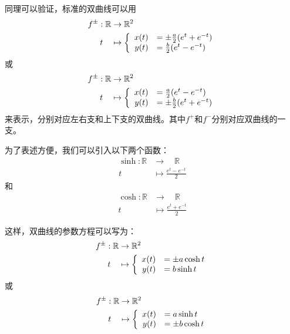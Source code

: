 \documentclass[12pt,UTF8]{ctexbook}
\theoremstyle{definition}
\theoremstyle{plain}
\begin{document}
同理可以验证，标准的双曲线可以用
\begin{align*}
    f^{\pm}: \mathbb{R} &\rightarrow \mathbb{R}^2 \\
    t\quad &\mapsto\left\{
        \begin{array}[]{rl}
            x(t) &= \pm\frac{a}{2}(e^t + e^{-t}) \\
            y(t) &= \frac{b}{2}(e^t - e^{-t}) \\
        \end{array}
    \right.
\end{align*}
或
\begin{align*}
    f^{\pm}: \mathbb{R} &\rightarrow \mathbb{R}^2 \\
    t\quad &\mapsto\left\{
        \begin{array}[]{rl}
            x(t) &= \frac{a}{2}(e^t - e^{-t}) \\
            y(t) &= \pm\frac{b}{2}(e^t + e^{-t}) \\
        \end{array}
    \right.
\end{align*}
来表示，分别对应左右支和上下支的双曲线。其中$f^+$和$f^-$分别对应双曲线的一支。

为了表述方便，我们可以引入以下两个函数：
\begin{align*}
    \sinh: \mathbb{R} &\rightarrow \quad \mathbb{R} \\
    t\; &\mapsto \frac{e^t - e^{-t}}{2} 
\end{align*}
和
\begin{align*}
    \cosh: \mathbb{R} &\rightarrow \quad \mathbb{R} \\
    t\; &\mapsto \frac{e^t + e^{-t}}{2} 
\end{align*}

这样，双曲线的参数方程可以写为：
\begin{align*}
    f^{\pm}: \mathbb{R} &\rightarrow \mathbb{R}^2 \\
    t\quad &\mapsto\left\{
        \begin{array}[]{rl}
            x(t) &= \pm a\cosh{t} \\
            y(t) &= b\sinh{t} \\
        \end{array}
    \right.
\end{align*}
或
\begin{align*}
    f^{\pm}: \mathbb{R} &\rightarrow \mathbb{R}^2 \\
    t\quad &\mapsto\left\{
        \begin{array}[]{rl}
            x(t) &= a\sinh{t} \\
            y(t) &= \pm b\cosh{t} \\
        \end{array}
    \right.
\end{align*}
\end{document}

